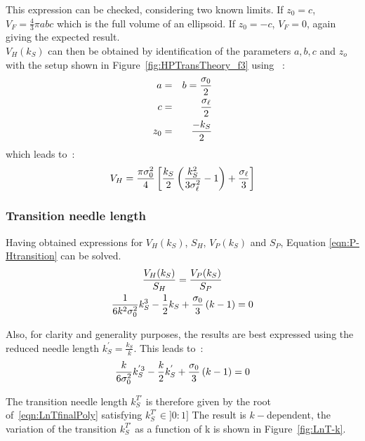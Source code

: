 This expression can be checked, considering two known limits.
If $z_0=c$, $V_F = \frac{4}{3} \pi abc$ which is the full volume of an ellipsoid.
If $z_0=-c$, $V_F = 0$, again giving the expected result.\\

$V_H(k_S)$ can then be obtained by identification of the parameters $a,b,c$ and $z_o$ with the
setup shown in Figure~\ref{fig:HPTransTheory_f3} using ~:
\begin{eqnarray*}
	a &=& b = \frac{\sigma_0}{2}\\
	c &=& \frac{\sigma_\ell}{2}	\\
	z_0 &=& \frac{-k_S}{2}
\end{eqnarray*}
%
which leads to~:
%
\begin{equation}
	V_H = \frac{\pi\sigma_0^2}{4}
	\left[
	\frac{k_S}{2} \left( \frac{k_S^2}{3\sigma_\ell^2} -1  \right) + \frac{\sigma_\ell}{3}
	\right]
	\label{eqn:V_H(Ln)}
\end{equation}



\subsubsection{Transition needle length }

Having obtained expressions for $V_H(k_S)$, $S_H$, $V_P(k_S)$ and $S_P$,
Equation \ref{eqn:P-Htransition} can be solved.
%
\begin{gather}
        \frac{V_H(k_S)}{S_H} = \frac{V_P(k_S)}{S_P}                     \\
        \frac{1}{6k^2\sigma_0^2}k_S^3 - \frac{1}{2}k_S + \frac{\sigma_0}{3}\left( k-1\right) = 0
\end{gather}

Also, for clarity and generality purposes, the results are best expressed using the reduced 
needle length $k_S^{'} = \frac{k_S}{k}$. This leads to~:
\begin{equation}
	\frac{k}{6\sigma_0^2}k_S^{'3} - \frac{k}{2}k_S^{'} +\frac{\sigma_0}{3}\left( k-1\right) = 0
	\label{eqn:LnTfinalPoly}
\end{equation}

The transition needle length $k_S^{T\prime}$ is therefore given by the root 
of~\ref{eqn:LnTfinalPoly} satisfying $k_S^{T\prime} \in ]0:1]$
The result is $k-$dependent, the variation of the transition $k_S^{T\prime}$ as a function
of k is shown in Figure~\ref{fig:LnT-k}.

